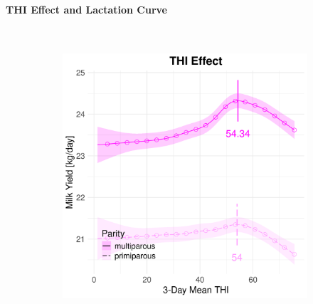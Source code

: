 \paragraph{THI Effect and Lactation Curve} \quad \\
\begin{figure}[H]
    \centering
    \begin{subfigure}[b]{0.45\textwidth}
        \centering
        \includegraphics[width=\textwidth]{thesis/figures/models/milk/before2010/sf_milk_before2010/sf_milk_before2010_marginal_thi_milk_combined.png}
    \end{subfigure}
    \hspace{0.05\textwidth} %
    \begin{subfigure}[b]{0.45\textwidth}
        \centering

\end{subfigure}
\end{figure}
